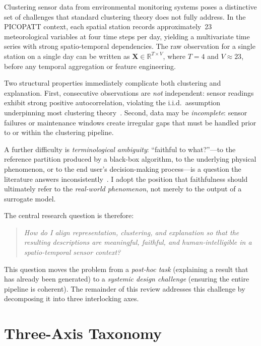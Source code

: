 \documentclass{article}
\theoremstyle{plain}
\theoremstyle{definition}
\theoremstyle{remark}
\begin{document}
Clustering sensor data from environmental monitoring systems poses a
distinctive set of challenges that standard clustering theory does not
fully address. In the PICOPATT context, each spatial station records
approximately~23 meteorological variables at four time steps per day,
yielding a multivariate time series with strong spatio-temporal
dependencies. The raw observation for a single station on a single day
can be written as $\mathbf{X} \in \mathbb{R}^{T \times V}$, where $T=4$
and $V \approx 23$, before any temporal aggregation or feature engineering.

Two structural properties immediately complicate both clustering and
explanation. First, consecutive observations are \emph{not} independent:
sensor readings exhibit strong positive autocorrelation, violating the
i.i.d.\ assumption underpinning most clustering
theory~\cite{hamdi_spatiotemporal_2022}. Second, data may be \emph{incomplete}: sensor
failures or maintenance windows create irregular gaps that must be handled
prior to or within the clustering pipeline.

A further difficulty is \emph{terminological ambiguity}: ``faithful to
what?''---to the reference partition produced by a black-box algorithm,
to the underlying physical phenomenon, or to the end user's
decision-making process---is a question the literature answers
inconsistently~\cite{portugal_framework_2024}. I adopt the position that faithfulness
should ultimately refer to the \emph{real-world phenomenon}, not merely
to the output of a surrogate model.

The central research question is therefore:
\begin{quote}
  \emph{How do I align representation, clustering, and explanation so
  that the resulting descriptions are meaningful, faithful, and
  human-intelligible in a spatio-temporal sensor context?}
\end{quote}
This question moves the problem from a \emph{post-hoc task} (explaining
a result that has already been generated) to a \emph{systemic design
challenge} (ensuring the entire pipeline is coherent). The remainder of
this review addresses this challenge by decomposing it into three
interlocking axes.

\section{Three-Axis Taxonomy}
\label{sec:taxonomy}
\end{document}
